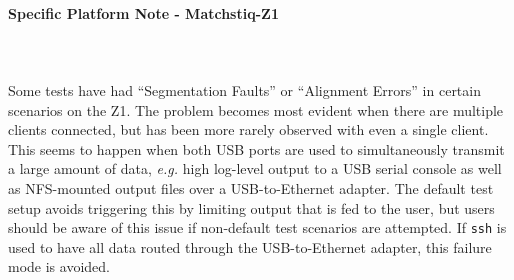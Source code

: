 \documentclass{article}
\begin{document}
\paragraph{Specific Platform Note - Matchstiq-Z1}
~\\
\\
Some tests have had ``Segmentation Faults'' or ``Alignment Errors'' in certain scenarios on the Z1. The problem becomes most evident when there are multiple clients connected, but has been more rarely observed with even a single client. This seems to happen when both USB ports are used to simultaneously transmit a large amount of data, \textit{e.g.} high log-level output to a USB serial console as well as NFS-mounted output files over a USB-to-Ethernet adapter. The default test setup avoids triggering this by limiting output that is fed to the user, but users should be aware of this issue if non-default test scenarios are attempted. If \texttt{ssh} is used to have all data routed through the USB-to-Ethernet adapter, this failure mode is avoided.\par

\pagebreak
\end{document}
